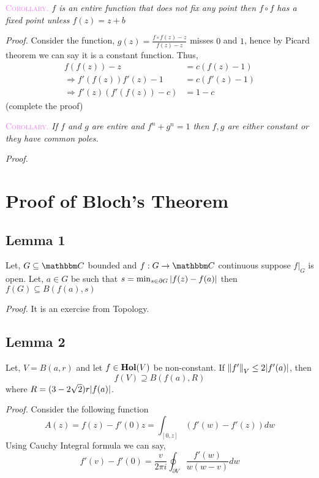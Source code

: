 \documentclass[../ComplexAnalysis_Notes.tex]{subfiles}
\begin{document}
\hspace*{0.6cm} \textcolor{violet}{\textsc{Corollary}.} \textit{$f$ is an entire function that does not fix any point then $f \circ f$ has a fixed point unless $f(z)=z+b$}

\textit{Proof.} Consider the function, $g(z) = \frac{f\circ f (z)-z}{f(z)-z}$ misses $0$ and $1$, hence by Picard theorem we can say it is a constant function. Thus, \begin{align*}
    f(f(z))-z & =c(f(z)-1) \\
    \Rightarrow f'(f(z))f'(z) - 1& = c ( f'(z)-1) \\
    \Rightarrow f'(z)(f'(f(z))-c) &= 1-c
\end{align*}
(complete the proof)
\vspace*{0.2cm}

\hspace*{0.6cm} \textcolor{violet}{\textsc{Corollary}.} \textit{If $f$ and $g$ are entire and $f^n+g^n=1$ then $f,g$ are either constant or they have common poles.}

\textit{Proof.}

\section*{Proof of Bloch's Theorem}

\subsection*{Lemma 1} Let, $G \subseteq \C$ bounded and $f: G \to \C$ continuous suppose $f|_G$ is open. Let, $a \in G$ be such that $s = \min_{s \in \partial G} \abs{f(z)-f(a)}$ then $f(G)\subseteq B(f(a),s)$

\noindent \textit{Proof.} It is an exercise from Topology.

\subsection*{Lemma 2}

Let, $V = B(a,r)$ and let $f \in \operatorname{\mathbf{Hol}}(V)$ be non-constant. If $\norm{f'}_V \leq 2\abs{f'(a)}$, then $$f(V)\supseteq B(f(a),R)$$ where $R = (3-2\sqrt{2})r \abs{f(a)}$. 

\vspace*{0.2cm}

\noindent \textit{Proof.}  Consider the following function $$A(z)=f(z)-f'(0)z = \int_{[0,z]} (f'(w)-f'(z))dw$$ Using Cauchy Integral formula we can say, $$f'(v)-f'(0) = \frac{v}{2\pi i} \oint_{\partial V} \frac{f'(w)}{w(w-v)} dw$$
\end{document}

